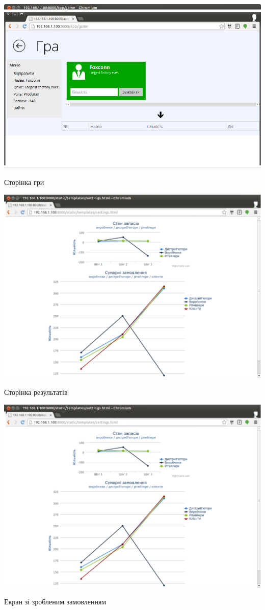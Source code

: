 \begin{stdfigure}
    \includegraphics[width=7in]{images/screen/game_screen.png}
    \caption{Сторінка гри}
    \label{fig:game_screen}
\end{stdfigure}   
\begin{stdfigure}
    \includegraphics[width=7in]{images/screen/plot_screen.png}
    \caption{Сторінка результатів}
    \label{fig:plot_screen}
\end{stdfigure}   
\begin{stdfigure}
    \includegraphics[width=7in]{images/screen/plot_screen.png}
    \caption{Екран зі зробленим замовленням}
    \label{fig:plot_screen}
\end{stdfigure}   
